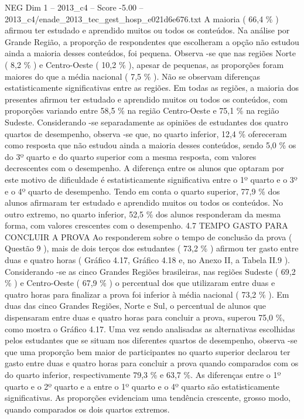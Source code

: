 \begin{textsample}{NEG Dim 1 – 2013\_c4 – Score -5.00 – 2013\_c4/enade\_2013\_tec\_gest\_hosp\_e021d6e676.txt}
A maioria ( 66,4 \% ) afirmou ter estudado e aprendido muitos ou todos os conteúdos.
Na análise por Grande Região, a proporção de respondentes que escolheram a opção não estudou ainda a maioria desses conteúdos, foi pequena.
Observa -se que nas regiões Norte ( 8,2 \% ) e Centro-Oeste ( 10,2 \% ), apesar de pequenas, as proporções foram maiores do que a média nacional ( 7,5 \% ).
Não se observam diferenças estatisticamente significativas entre as regiões.
Em todas as regiões, a maioria dos presentes afirmou ter estudado e aprendido muitos ou todos os conteúdos, com proporções variando entre 58,5 \% na região Centro-Oeste e 75,1 \% na região Sudeste.
Considerando -se separadamente as opiniões de estudantes dos quatro quartos de desempenho, observa -se que, no quarto inferior, 12,4 \% ofereceram como resposta que não estudou ainda a maioria desses conteúdos, sendo 5,0 \% os do 3º quarto e do quarto superior com a mesma resposta, com valores decrescentes com o desempenho.
A diferença entre os alunos que optaram por este motivo de dificuldade é estatisticamente significativa entre o 1º quarto e o 3º e o 4º quarto de desempenho.
Tendo em conta o quarto superior, 77,9 \% dos alunos afirmaram ter estudado e aprendido muitos ou todos os conteúdos.
No outro extremo, no quarto inferior, 52,5 \% dos alunos responderam da mesma forma, com valores crescentes com o desempenho. 4.7 TEMPO GASTO PARA CONCLUIR A PROVA Ao responderem sobre o tempo de conclusão da prova ( Questão 9 ), mais de dois terços dos estudantes ( 73,2 \% ) afirmou ter gasto entre duas e quatro horas ( Gráfico 4.17, Gráfico 4.18 e, no Anexo II, a Tabela II.9 ).
Considerando -se as cinco Grandes Regiões brasileiras, nas regiões Sudeste ( 69,2 \% ) e Centro-Oeste ( 67,9 \% ) o percentual dos que utilizaram entre duas e quatro horas para finalizar a prova foi inferior à média nacional ( 73,2 \% ).
Em duas das cinco Grandes Regiões, Norte e Sul, o percentual de alunos que dispensaram entre duas e quatro horas para concluir a prova, superou 75,0 \%, como mostra o Gráfico 4.17.
Uma vez sendo analisadas as alternativas escolhidas pelos estudantes que se situam nos diferentes quartos de desempenho, observa -se que uma proporção bem maior de participantes no quarto superior declarou ter gasto entre duas e quatro horas para concluir a prova quando comparados com os do quarto inferior, respectivamente 79,3 \% e 63,7 \%.
As diferenças entre o 1º quarto e o 2º quarto e a entre o 1º quarto e o 4º quarto são estatisticamente significativas.
As proporções evidenciam uma tendência crescente, grosso modo, quando comparados os dois quartos extremos.

\end{textsample}
